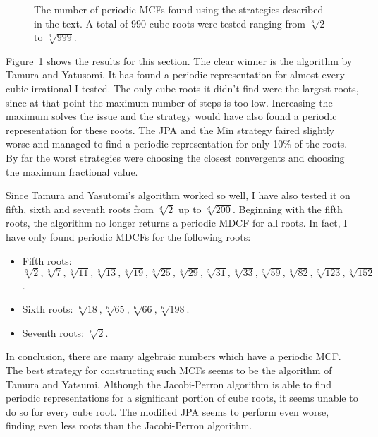 \begin{figure}[tbp]
  \centering
  
  \caption{
    The number of periodic MCFs found using the strategies described in the text.
    A total of $990$ cube roots were tested ranging from $\sqrt[3]{2}$ to $\sqrt[3]{999}$.
  }
  \label{fig:comparison}
\end{figure}

Figure~\ref{fig:comparison} shows the results for this section.
The clear winner is the algorithm by Tamura and Yatusomi.
It has found a periodic representation for almost every cubic irrational I tested.
The only cube roots it didn't find were the largest roots,
since at that point the maximum number of steps is too low.
Increasing the maximum solves the issue and the strategy would have also found
a periodic representation for these roots.
The JPA and the Min strategy faired slightly worse and managed to find a
periodic representation for only 10\% of the roots.
By far the worst strategies were choosing the closest convergents and choosing
the maximum fractional value.

Since Tamura and Yasutomi's algorithm worked so well,
I have also tested it on fifth, sixth and seventh roots
from $\sqrt[d]{2}$ up to $\sqrt[d]{200}$.
Beginning with the fifth roots, the algorithm no longer returns a periodic MDCF for all roots.
In fact, I have only found periodic MDCFs for the following roots:
\begin{itemize}
  \item Fifth roots:
    $\sqrt[5]{2}, \sqrt[5]{7}, \sqrt[5]{11}, \sqrt[5]{13}, \sqrt[5]{19},
    \sqrt[5]{25}, \sqrt[5]{29}, \sqrt[5]{31}, \sqrt[5]{33}, \sqrt[5]{59},
    \sqrt[5]{82}, \sqrt[5]{123}, \sqrt[5]{152}$.
  \item Sixth roots: $\sqrt[6]{18}, \sqrt[6]{65}, \sqrt[6]{66},\sqrt[6]{198}$.
  \item Seventh roots: $\sqrt[6]{2}$.
\end{itemize}

In conclusion,
there are many algebraic numbers which have a periodic MCF.
The best strategy for constructing such MCFs seems to be the algorithm of Tamura and Yatsumi.
Although the Jacobi-Perron algorithm is able to find periodic representations
for a significant portion of cube roots, it seems unable to do so for every
cube root.
The modified JPA seems to perform even worse, finding even less roots than the
Jacobi-Perron algorithm.

